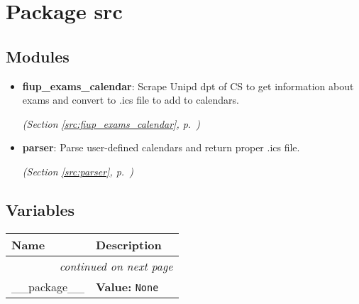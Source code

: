 %
%
%


\section{Package src}

    \label{src}


\subsection{Modules}

\begin{itemize}
\setlength{\parskip}{0ex}
\item \textbf{fiup\_exams\_calendar}: Scrape Unipd dpt of CS to get information about exams and convert to .ics file to add to calendars. 


  \textit{(Section \ref{src:fiup_exams_calendar}, p.~\pageref{src:fiup_exams_calendar})}

\item \textbf{parser}: Parse user-defined calendars and return proper .ics file. 


  \textit{(Section \ref{src:parser}, p.~\pageref{src:parser})}

\end{itemize}



  \subsection{Variables}

    \vspace{-1cm}
\hspace{\varindent}\begin{longtable}{|p{\varnamewidth}|p{\vardescrwidth}|l}
\cline{1-2}
\cline{1-2} \centering \textbf{Name} & \centering \textbf{Description}& \\
\cline{1-2}
\endhead\cline{1-2}\multicolumn{3}{r}{\small\textit{continued on next page}}\\\endfoot\cline{1-2}
\endlastfoot\raggedright \_\-\_\-p\-a\-c\-k\-a\-g\-e\-\_\-\_\- & \raggedright \textbf{Value:} 
{\tt None}&\\
\cline{1-2}
\end{longtable}

